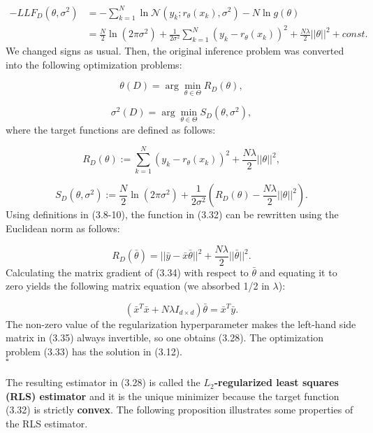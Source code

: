 \documentclass{report}
\begin{document}
\begin{equation}
\begin{split}
-LLF_{D}(\theta,\sigma^2)&=-\sum_{k=1}^N\ln\mathcal{N}(y_k;r_\theta(x_k),\sigma^2) - N\ln g(\theta)\\
&=\frac{N}{2}\ln(2\pi\sigma^2)+\frac{1}{2\sigma^2}\sum_{k=1}^N(y_k-r_\theta(x_k))^2+\frac{N\lambda}{2}||\theta||^2 + const.
\end{split}
\end{equation}
We changed signs as usual. Then, the original inference problem was converted into the following optimization problems:

\begin{equation}
\theta(D) = \arg\min_{\theta \in \Theta} R_{D}(\theta),
\end{equation}

\begin{equation}
\sigma^2(D) = \arg\min_{\theta \in \Theta} S_{D}(\theta,\sigma^2),
\end{equation}
where the target functions are defined as follows:

\begin{equation}
R_{D}(\theta) :=\sum_{k=1}^N(y_k-r_\theta(x_k))^2 + \frac{N\lambda}{2}||\theta||^2,
\end{equation}

\begin{equation}
S_{D}(\theta,\sigma^2) := \frac{N}{2}\ln(2\pi\sigma^2)+\frac{1}{2\sigma^2}\left(R_{D}(\theta)-\frac{N\lambda}{2}||\theta||^2\right).
\end{equation}
Using definitions in (3.8-10), the function in (3.32) can be rewritten using the Euclidean norm as follows:

\begin{equation}
R_{D}(\bar{\theta}) = ||\bar{y} -\bar{x}\bar{\theta}||^2 +\frac{N\lambda}{2}||\bar{\theta}||^2.
\end{equation}
Calculating the matrix gradient of (3.34) with respect to $\bar{\theta}$ and equating it to zero yields the following matrix equation (we absorbed 1/2 in $\lambda$):

\begin{equation}
(\bar{x}^T\bar{x}+ N\lambda I_{d\times d})\bar{\theta} = \bar{x}^T\bar{y}.
\end{equation}
The non-zero value of the regularization hyperparameter makes the left-hand side matrix in (3.35) always invertible, so one obtains (3.28). The optimization problem (3.33) has the solution in (3.12).\\$\square$\\\\
The resulting estimator in (3.28) is called the \textbf{$L_2$-regularized least squares (RLS) estimator} and it is the unique minimizer because the target function (3.32) is strictly \textbf{convex}. The following proposition illustrates some properties of the RLS estimator.
\end{document}
